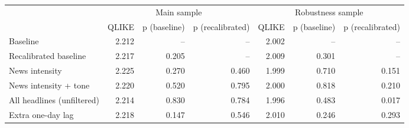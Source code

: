 \begin{tabular}{lrrrrrr}
\toprule
 & \multicolumn{3}{c}{Main sample} & \multicolumn{3}{c}{Robustness sample} \\
 & QLIKE & p (baseline) & p (recalibrated) & QLIKE & p (baseline) & p (recalibrated) \\
\midrule
Baseline & 2.212 & -- & -- & 2.002 & -- & -- \\
Recalibrated baseline & 2.217 & 0.205 & -- & 2.009 & 0.301 & -- \\
News intensity & 2.225 & 0.270 & 0.460 & 1.999 & 0.710 & 0.151 \\
News intensity + tone & 2.220 & 0.520 & 0.795 & 2.000 & 0.818 & 0.210 \\
All headlines (unfiltered) & 2.214 & 0.830 & 0.784 & 1.996 & 0.483 & 0.017 \\
Extra one-day lag & 2.218 & 0.147 & 0.546 & 2.010 & 0.246 & 0.293 \\
\bottomrule
\end{tabular}
